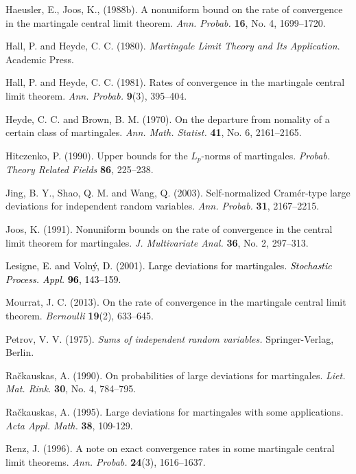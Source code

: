 \documentclass{gSTA2e}
\theoremstyle{plain}
\theoremstyle{definition}
\theoremstyle{remark}
\begin{document}
\begin{thebibliography}{99}
 Haeusler, E., Joos, K., (1988b). A nonuniform bound on the rate of convergence in the martingale central limit theorem. \emph{Ann. Probab.} \textbf{16}, No. 4,  1699--1720.

 Hall, P. and Heyde, C. C. (1980). \textit{Martingale Limit Theory and Its Application}. Academic Press.


 Hall, P. and Heyde, C. C. (1981). Rates of convergence in the martingale central limit theorem. \emph{Ann. Probab.}
\textbf{9}(3), 395--404.

 Heyde, C. C. and Brown, B. M. (1970). On the departure from nomality of a certain class of martingales.
\emph{Ann. Math. Statist.} \textbf{41}, No. 6, 2161--2165.



 Hitczenko, P.  (1990). Upper bounds for the $L_{p}$-norms of martingales. \emph{Probab. Theory Related Fields} \textbf{86},  225--238.




 Jing, B. Y., Shao, Q. M. and Wang, Q. (2003). Self-normalized Cram\'{e}r-type large deviations
for independent random variables. \emph{Ann. Probab.} \textbf{31}, 2167--2215.

 Joos, K. (1991). Nonuniform bounds on the rate of convergence in the central limit theorem for martingales. \emph{J. Multivariate Anal.} \textbf{36}, No. 2, 297--313.


\textcolor{black}{  Lesigne, E. and  Voln\'y, D.  (2001). Large deviations for martingales.
\emph{Stochastic Process. Appl.} \textbf{96}, 143--159.}


  Mourrat, J. C. (2013). On the rate of convergence in the martingale central limit theorem. \emph{Bernoulli}    \textbf{19}(2), 633--645.


 Petrov, V. V. (1975).  \emph{Sums of
independent random variables.} Springer-Verlag, Berlin.

  Ra\v{c}kauskas, A. (1990). On probabilities of large
deviations for martingales. \emph{Liet. Mat. Rink.} \textbf{30}, No. 4,
784--795.

  Ra\v{c}kauskas, A. (1995). Large deviations for
martingales with some applications. \emph{Acta Appl. Math.}
\textbf{38}, 109-129.

 Renz, J. (1996). A note on exact convergence rates in some martingale central limit theorems.
 \emph{Ann. Probab.}   \textbf{24}(3), 1616--1637.




\end{thebibliography}
\end{document}

